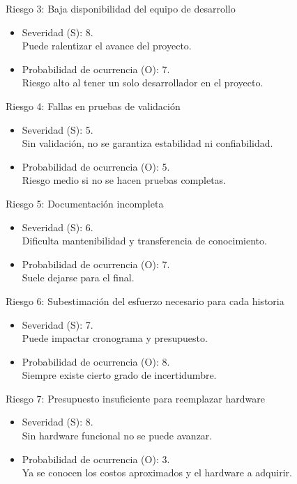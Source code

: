 \documentclass[
11pt, %
]{charter}
\begin{document}
Riesgo 3: Baja disponibilidad del equipo de desarrollo
\begin{itemize}
	\item Severidad (S): 8. \\
	Puede ralentizar el avance del proyecto.
	\item Probabilidad de ocurrencia (O): 7. \\
	Riesgo alto al tener un solo desarrollador en el proyecto.
\end{itemize}   

Riesgo 4: Fallas en pruebas de validación
\begin{itemize}
	\item Severidad (S): 5. \\
	Sin validación, no se garantiza estabilidad ni confiabilidad.
	\item Probabilidad de ocurrencia (O): 5. \\
	Riesgo medio si no se hacen pruebas completas.
\end{itemize}   

Riesgo 5: Documentación incompleta
\begin{itemize}
	\item Severidad (S): 6. \\
	Dificulta mantenibilidad y transferencia de conocimiento.
	\item Probabilidad de ocurrencia (O): 7. \\
	Suele dejarse para el final.
\end{itemize}   

Riesgo 6: Subestimación del esfuerzo necesario para cada historia
\begin{itemize}
	\item Severidad (S): 7. \\
	Puede impactar cronograma y presupuesto.
	\item Probabilidad de ocurrencia (O): 8. \\
	Siempre existe cierto grado de incertidumbre.
\end{itemize}   

Riesgo 7: Presupuesto insuficiente para reemplazar hardware
\begin{itemize}
	\item Severidad (S): 8. \\
	Sin hardware funcional no se puede avanzar.
	\item Probabilidad de ocurrencia (O): 3. \\
	Ya se conocen los costos aproximados y el hardware a adquirir.
\end{itemize}  
\end{document}
